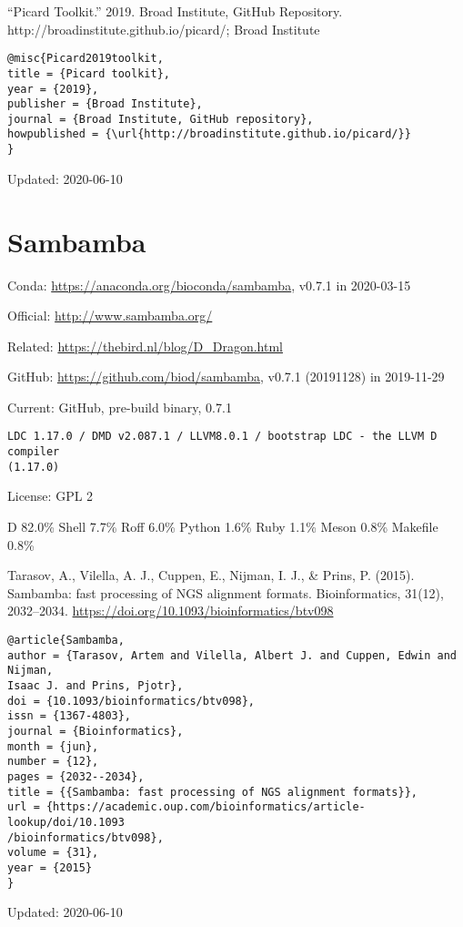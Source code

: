\documentclass[]{article}
\begin{document}
``Picard Toolkit.'' 2019. Broad Institute, GitHub Repository. http://broadinstitute.github.io/picard/; Broad Institute

\begin{verbatim}
@misc{Picard2019toolkit,
title = {Picard toolkit},
year = {2019},
publisher = {Broad Institute},
journal = {Broad Institute, GitHub repository},
howpublished = {\url{http://broadinstitute.github.io/picard/}}
}
\end{verbatim}

Updated: 2020-06-10

\section{Sambamba}

Conda: \url{https://anaconda.org/bioconda/sambamba}, v0.7.1 in 2020-03-15 

Official: \url{http://www.sambamba.org/}

Related: \url{https://thebird.nl/blog/D_Dragon.html}

GitHub: \url{https://github.com/biod/sambamba}, v0.7.1 (20191128) in 2019-11-29

Current: GitHub, pre-build binary, 0.7.1

\begin{verbatim}
LDC 1.17.0 / DMD v2.087.1 / LLVM8.0.1 / bootstrap LDC - the LLVM D compiler
(1.17.0)
\end{verbatim}

License: GPL 2

D 82.0\% Shell 7.7\% Roff 6.0\% Python 1.6\% Ruby 1.1\% Meson 0.8\% Makefile 0.8\%

Tarasov, A., Vilella, A. J., Cuppen, E., Nijman, I. J., \& Prins, P. (2015). Sambamba: fast processing of NGS alignment formats. Bioinformatics, 31(12), 2032–2034. \url{https://doi.org/10.1093/bioinformatics/btv098}

\begin{verbatim}
@article{Sambamba,
author = {Tarasov, Artem and Vilella, Albert J. and Cuppen, Edwin and Nijman,
Isaac J. and Prins, Pjotr},
doi = {10.1093/bioinformatics/btv098},
issn = {1367-4803},
journal = {Bioinformatics},
month = {jun},
number = {12},
pages = {2032--2034},
title = {{Sambamba: fast processing of NGS alignment formats}},
url = {https://academic.oup.com/bioinformatics/article-lookup/doi/10.1093
/bioinformatics/btv098},
volume = {31},
year = {2015}
}
\end{verbatim}

Updated: 2020-06-10
\end{document}
